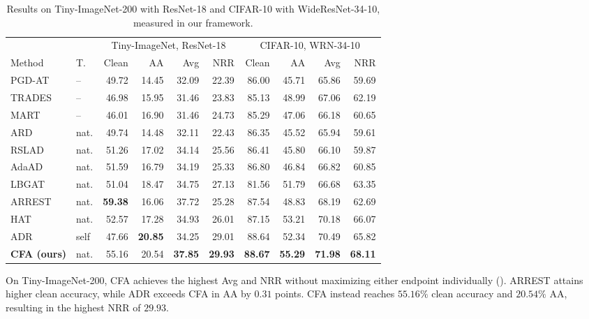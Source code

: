 \documentclass{article} %
\theoremstyle{plain}
\begin{document}
\begin{table}[!htbp]
  \centering
  \footnotesize
  \setlength{\tabcolsep}{3.2pt}
  \caption{
  Results on Tiny-ImageNet-200 with ResNet-18 and CIFAR-10 with
  WideResNet-34-10, measured in our framework.
  }
  \label{tab:scale}
  \begin{tabular}{llrrrrrrrr}
    \toprule
    & & \multicolumn{4}{c}{Tiny-ImageNet, ResNet-18}
      & \multicolumn{4}{c}{CIFAR-10, WRN-34-10} \\
    \cmidrule(lr){3-6}\cmidrule(lr){7-10}
    Method & T. & Clean & AA & Avg & NRR
           & Clean & AA & Avg & NRR \\
    \midrule
    PGD-AT & -- & 49.72 & 14.45 & 32.09 & 22.39
                 & 86.00 & 45.71 & 65.86 & 59.69 \\
    TRADES & -- & 46.98 & 15.95 & 31.46 & 23.83
                 & 85.13 & 48.99 & 67.06 & 62.19 \\
    MART & -- & 46.01 & 16.90 & 31.46 & 24.73
               & 85.29 & 47.06 & 66.18 & 60.65 \\
    \midrule
    ARD & nat. & 49.74 & 14.48 & 32.11 & 22.43
               & 86.35 & 45.52 & 65.94 & 59.61 \\
    RSLAD & nat. & 51.26 & 17.02 & 34.14 & 25.56
                 & 86.41 & 45.80 & 66.10 & 59.87 \\
    AdaAD & nat. & 51.59 & 16.79 & 34.19 & 25.33
                 & 86.80 & 46.84 & 66.82 & 60.85 \\
    LBGAT & nat. & 51.04 & 18.47 & 34.75 & 27.13
                 & 81.56 & 51.79 & 66.68 & 63.35 \\
    ARREST & nat. & \textbf{59.38} & 16.06 & 37.72 & 25.28
                  & 87.54 & 48.83 & 68.19 & 62.69 \\
    HAT & nat. & 52.57 & 17.28 & 34.93 & 26.01
               & 87.15 & 53.21 & 70.18 & 66.07 \\
    ADR & self & 47.66 & \textbf{20.85} & 34.25 & 29.01
               & 88.64 & 52.34 & 70.49 & 65.82 \\
    \midrule
    \textbf{CFA (ours)}
      & nat.
      & 55.16 & 20.54 & \textbf{37.85} & \textbf{29.93}
      & \textbf{88.67} & \textbf{55.29}
      & \textbf{71.98} & \textbf{68.11} \\
    \bottomrule
  \end{tabular}
\end{table}

On Tiny-ImageNet-200, CFA achieves the highest Avg and NRR without maximizing
either endpoint individually ().
ARREST attains higher clean accuracy, while ADR exceeds CFA in AA by
\(0.31\) points.
CFA instead reaches \(55.16\%\) clean accuracy and \(20.54\%\) AA,
resulting in the highest NRR of \(29.93\).
\end{document}
